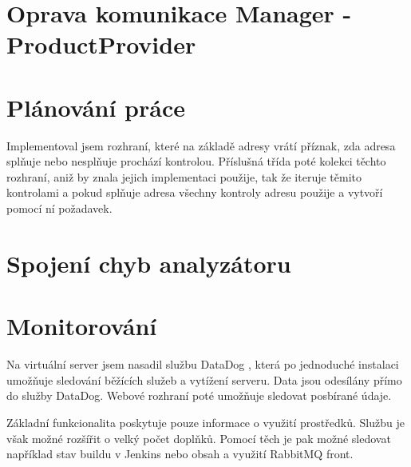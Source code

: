 \documentclass[thesis=B,czech]{FITthesis}[2012/06/26]
\begin{document}
\section{Oprava komunikace Manager - ProductProvider}


\section{Plánování práce}
Implementoval jsem rozhraní, které na základě adresy 
vrátí příznak, zda adresa splňuje nebo nesplňuje prochází kontrolou. Příslušná třída poté
kolekci těchto rozhraní, aniž by znala jejich implementaci použije, tak že iteruje těmito kontrolami a pokud
splňuje adresa všechny kontroly adresu použije a vytvoří pomocí ní požadavek.

\section{Spojení chyb analyzátoru}


\section{Monitorování}
Na virtuální server jsem nasadil službu DataDog \cite{dataDog}, která po jednoduché instalaci umožňuje sledování běžících služeb
a vytížení serveru. Data jsou odesílány přímo do služby DataDog. Webové rozhraní poté umožňuje sledovat posbírané údaje.

Základní funkcionalita poskytuje pouze informace o využití prostředků. Službu je však možné rozšířit o velký počet doplňků. Pomocí těch je pak možné sledovat
například stav buildu v Jenkins nebo obsah a využití RabbitMQ front.
\end{document}
